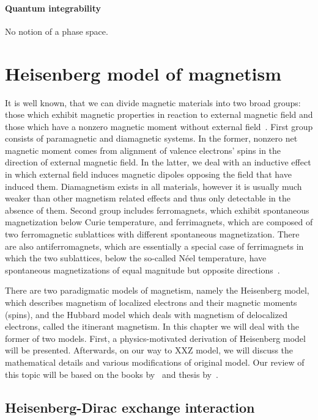 \paragraph{Quantum integrability} No notion of a phase space.



\section{Heisenberg model of magnetism\label{sec:XXZ}}
    It is well known, that we can divide magnetic materials into two broad groups: those which
exhibit magnetic properties in reaction to external magnetic field and those which have a nonzero
magnetic moment without external field~\autocite{spalek2015}. First group consists of paramagnetic
and diamagnetic systems. In the former, nonzero net magnetic moment comes from alignment of
valence electrons' spins in the direction of external magnetic field. In the latter, we deal with
 an inductive effect in which external field induces magnetic dipoles opposing the field that have
induced them. Diamagnetism exists in all materials, however it is usually much weaker than other magnetism related
effects and thus only detectable in the absence of them. Second group includes ferromagnets, which
exhibit spontaneous magnetization below Curie temperature, and ferrimagnets, which are 
composed of two ferromagnetic sublattices with different spontaneous magnetization. There
are also antiferromagnets, which are essentially a special case of ferrimagnets in which the two sublattices,
below the so-called N{\'e}el temperature, have spontaneous magnetizations of equal magnitude
but opposite directions~\autocite{nolting2018theoretical}.

There are two paradigmatic models of magnetism, namely the Heisenberg model, which describes magnetism
of localized electrons and their magnetic moments (spins), and the Hubbard model which deals with
magnetism of delocalized electrons, called the itinerant magnetism. 
In this chapter we will deal with the former of two models.
First, a physics-motivated derivation of Heisenberg model will be presented. Afterwards,
on our way to XXZ model, we will discuss the mathematical details and various modifications
of original model. Our review of this topic will be based on the books by~\textcite{spalek2015} and 
thesis by~\textcite{Ng2011HeisenbergM}.

\subsection{Heisenberg-Dirac exchange interaction}
